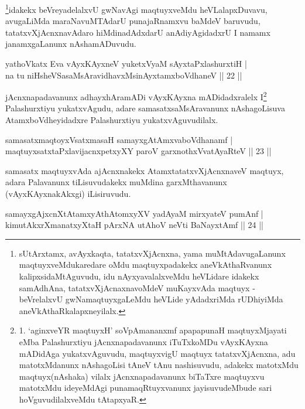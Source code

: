 \begin{artha}
\footnote{sUtArxtamx, avAyxkaqta, tatatxvXjAcnxna, yama muMtAdavugaLanunx 
maqtuyxveMdukaredare oMdu maqtuyxpadakekx aneVkAthaRvanunx kalipxsidaMtAguvudu, idu 
nAyxyavalalxveMdu heVLidare idakekx samAdhAna, tatatxvXjAcnaxnavoMdeV muKayxvAda maqtuyx -   
beVrelalxvU gwNamaqtuyxgaLeMdu heVLide yAdadxriMda rUDhiyiMda 
aneVkAthaRkalapxneyilalx.}idakekx beVreyadelalxvU gwNavAgi maqtuyxveMdu heVLalapxDuvavu, avugaLiMda maraNavuMTAdarU 
punajaRnamxvu baMdeV baruvudu, tatatxvXjAcnxnavAdaro hiMdinadAdxdarU anAdiyAgidadxrU I namamx 
janamxgaLanunx nAshamADuvudu.
\end{artha}

\begin{shl}
yathoVkatx Eva vAyxKAyxneV yuketxVyaM sAyxtaPxlashurxtiH |\\
na tu niHsheVSasaMsAravidhavxMsinAyxtamxboVdhaneV \hfill || 22 ||
\end{shl}

\begin{artha}
jAcnxnapadavanunx adhayxhAramADi vAyxKAyxna mADidadxralelx I\footnote{1. `aginxveYR maqtuyxH' soV\s pAmananxmf apapapunaH maqtuyxMjayati eMba Palashurxtiyu jAcnxnapadavanunx iTuTxkoMDu vAyxKAyxna mADidAga yukatxvAguvudu, maqtuyxvigU maqtuyx tatatxvXjAcnxna, adu matotxMdanunx nAshagoLisi tAneV tAnu nashisuvudu, adakekx matotxMdu maqtuyx(nAshaka) vilalx jAcnxnapadavanunx biTaTxre maqtuyxvu matotxMdu ideyeMdAgi punamaqRtuyxvanunx jayisuvudeMbude sari hoVguvudilalxveMdu tAtapxyaR.} Palashurxtiyu yukatxvAgudu, adare samasatxsaMsAravanunx nAshagoLisuva AtamxboVdheyidadxre Palashurxtiyu yukatxvAguvudilalx.
\end{artha}


\begin{shl}
samasatxmaqtoyxVsatxmasaH samayxgAtAmxvaboVdhanamf |\\
maqtuyxsatxtaPxlavijacnxpetxyXY paroV garxnothxV\s vatAyaRteV \hfill || 23 ||
\end{shl}

\begin{artha}
samasatx maqtuyxvAda ajAcnxnakekx AtamxtatatxvXjAcnxnaveV maqtuyx, adara Palavanunx tiLisuvudakekx muMdina garxMthavanunx (vAyxKAyxnakAkxgi) iLisiruvudu.
\end{artha}


\begin{shl}
samayxgAjxcnXtAtamxyAthAtomxyXV yadA\s yaM mirxyateV pumAnf |\\
kimutAkxrXmanatxyXtaH pArxNA utAhoV neVti BaNayxtAmf \hfill || 24 ||
\end{shl}

